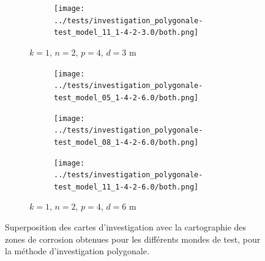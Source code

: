 \documentclass[francais,RandD]{rapportPFE}
\begin{document}
\begin{figure}[H]
\begin{subfigure}[t]{\linewidth}
\begin{subfigure}[t]{0.2\linewidth}
					\texttt{[image: ../tests/investigation\_polygonale-test\_model\_11\_1-4-2-3.0/both.png]}
				\end{subfigure}
				\caption{$k = 1$, $n = 2$, $p = 4$, $d = 3$ m}
			\end{subfigure}
			\hfill
			\begin{subfigure}[t]{\linewidth}
				\centering
				\begin{subfigure}[t]{0.2\linewidth}
					\texttt{[image: ../tests/investigation\_polygonale-test\_model\_05\_1-4-2-6.0/both.png]}
				\end{subfigure}
				\hfill
				\begin{subfigure}[t]{0.2\linewidth}
					\texttt{[image: ../tests/investigation\_polygonale-test\_model\_08\_1-4-2-6.0/both.png]}
				\end{subfigure}
				\hfill
				\begin{subfigure}[t]{0.2\linewidth}
					\texttt{[image: ../tests/investigation\_polygonale-test\_model\_11\_1-4-2-6.0/both.png]}
				\end{subfigure}
				\caption{$k = 1$, $n = 2$, $p = 4$, $d = 6$ m}
			\end{subfigure}
			\caption{Superposition des cartes d'investigation avec la cartographie des zones de corrosion obtenues pour les différents mondes de test, pour la méthode d'investigation polygonale.}
			\label{fig:investigation_polygonale_resultats}
		\end{figure}
\end{document}
